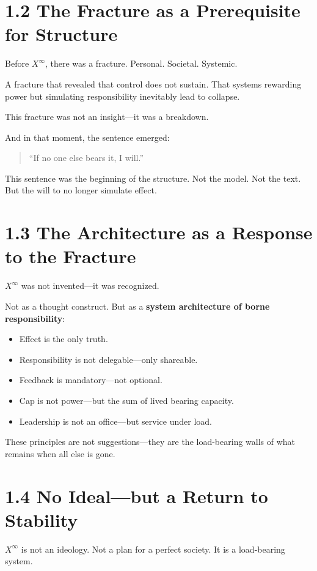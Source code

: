 \documentclass[12pt,a4paper]{book}
\begin{document}
\section*{1.2 The Fracture as a Prerequisite for Structure}

Before $X^\infty$, there was a fracture. Personal. Societal. Systemic.

A fracture that revealed that control does not sustain.
That systems rewarding power but simulating responsibility inevitably lead to collapse.

This fracture was not an insight—it was a breakdown.

And in that moment, the sentence emerged:

\begin{quote}
“If no one else bears it, I will.”
\end{quote}

This sentence was the beginning of the structure. Not the model. Not the text. But the will to no longer simulate effect.

\section*{1.3 The Architecture as a Response to the Fracture}

$X^\infty$ was not invented—it was recognized.

Not as a thought construct. But as a \textbf{system architecture of borne responsibility}:

\begin{itemize}
  \item Effect is the only truth.
  \item Responsibility is not delegable—only shareable.
  \item Feedback is mandatory—not optional.
  \item Cap is not power—but the sum of lived bearing capacity.
  \item Leadership is not an office—but service under load.
\end{itemize}

These principles are not suggestions—they are the load-bearing walls of what remains when all else is gone.

\section*{1.4 No Ideal—but a Return to Stability}

$X^\infty$ is not an ideology. Not a plan for a perfect society. It is a load-bearing system.
\end{document}
